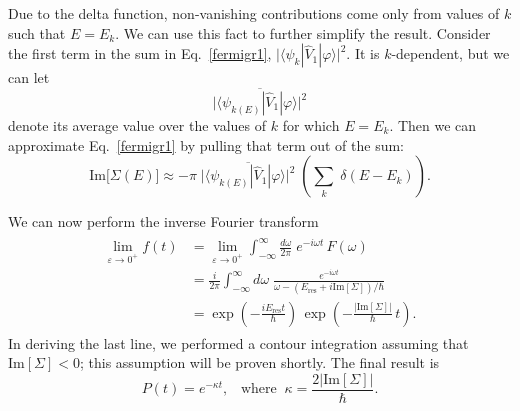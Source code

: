 \documentclass[pra,12pt]{revtex4}
\begin{document}
Due to the delta function, non-vanishing contributions come only from
values of $k$ such that $E = E_k$.  We can use this fact to further
simplify the result.  Consider the first term in the sum in
Eq.~\eqref{fermigr1}, $\big| \langle\psi_k|
\hat{V}_1|\varphi\rangle\big|^2$.  It is $k$-dependent, but we can let
\begin{equation*}
  \overline{\big| \langle\psi_{k(E)}| \hat{V}_1|\varphi\rangle\big|^2}
\end{equation*}
denote its average value over the values of $k$ for which $E = E_k$.
Then we can approximate Eq.~\eqref{fermigr1} by pulling that term out
of the sum:
\begin{equation}
  \mathrm{Im}\big[\Sigma(E)\big]
  \approx - \pi \;
  \overline{\big| \langle\psi_{k(E)}| \hat{V}_1|\varphi\rangle\big|^2}
  \; \left( \sum_k \; \delta(E-E_k) \right).
  \label{fermigr2}
\end{equation}









We can now perform the
inverse Fourier transform
\begin{align}
  \begin{aligned} \lim_{\varepsilon\rightarrow 0^+} f(t) &= \lim_{\varepsilon\rightarrow 0^+} \int_{-\infty}^{\infty} \frac{d\omega}{2\pi} \; e^{-i\omega t} \, F(\omega) \\ &= \frac{i}{2\pi} \int_{-\infty}^{\infty} d\omega\; \frac{e^{-i\omega t}}{\omega - (E_{\mathrm{res}}+i \mathrm{Im}[\Sigma])/\hbar}\\ &= \exp\left(-\frac{iE_{\mathrm{res}}t}{\hbar}\right)\, \exp\left(-\frac{|\mathrm{Im}[\Sigma]|}{\hbar}\,t\right). \end{aligned}
\end{align}
In deriving the last line, we performed a contour integration assuming
that $\mathrm{Im}[\Sigma] < 0$; this assumption will be proven
shortly.  The final result is
\begin{equation}
  P(t) = e^{-\kappa t}, \;\;\;\mathrm{where}\;\;\kappa = \frac{2|\mathrm{Im}[\Sigma]|}{\hbar}.
\end{equation}
\end{document}
